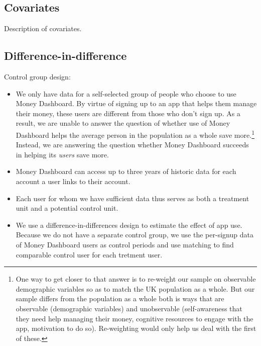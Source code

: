 \documentclass[a4paper, 11pt]{article}
\begin{document}
\subsection{Covariates}%
\label{sub:covariates}

Description of covariates.


\subsection{Difference-in-difference}%
\label{sub:difference_in_difference}

Control group design:
\begin{itemize}

    \item We only have data for a self-selected group of people who choose to
        use Money Dashboard. By virtue of signing up to an app that helps them
        manage their money, these users are different from those who don't sign
        up. As a result, we are unable to answer the question of whether use of
        Money Dashboard helps the average person in the population as a whole
        save more.\footnote{One way to get closer to that answer is to
            re-weight our sample on observable demographic variables so as to
            match the UK population as a whole. But our sample differs from the
            population as a whole both is ways that are observable (demographic
            variables) and unobservable (self-awareness that they need help
            managing their money, cognitive resources to engage with the app,
            motivation to do so). Re-weighting would only help us deal with the
        first of these.} Instead, we are answering the question whether Money
        Dashboard succeeds in helping its \textit{users} save more.

    \item Money Dashboard can access up to three years of historic data for
        each account a user links to their account.

    \item Each user for whom we have sufficient data thus serves as both a
        treatment unit and a potential control unit.

    \item We use a difference-in-differences design to estimate the effect of
        app use. Because we do not have a separate control group, we use the
        per-signup data of Money Dashboard users as control periods and use
        matching to find comparable control user for each tretment user.


\end{itemize}
\end{document}
